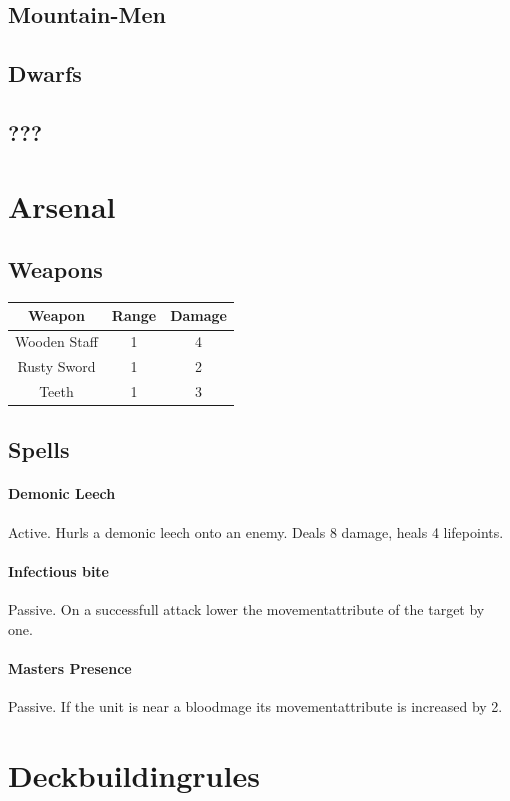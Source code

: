 \documentclass[a5paper,pagesize,10pt,bibtotoc,pointlessnumbers,
normalheadings,DIV=9,twoside=false]{scrbook}
\begin{document}
\section{Mountain-Men}

\section{Dwarfs}

\section{???}

\chapter{Arsenal}

\section{Weapons}

 \begin{tabular}{||c c c||} 
 \hline
 Weapon & Range & Damage \\
\hline \hline
Wooden Staff & 1 & 4 \\
\hline
Rusty Sword & 1 & 2 \\
\hline
Teeth & 1 & 3 \\
\hline
 
 \end{tabular}

\section{Spells}

\subsubsection{Demonic Leech}
Active. Hurls a demonic leech onto an enemy. Deals 8 damage, heals 4 lifepoints.

\subsubsection{Infectious bite}
Passive. On a successfull attack lower the movementattribute of the target by one.

\subsubsection{Masters Presence}
Passive. If the unit is near a bloodmage its movementattribute is increased by 2.

\subsubsection{}



\chapter{Deckbuildingrules}
\end{document}
